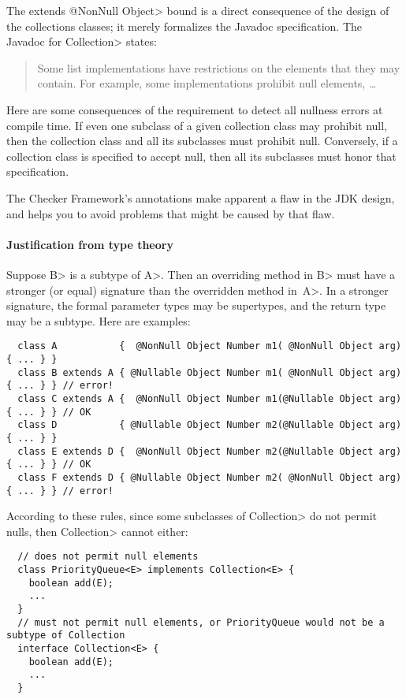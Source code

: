 The \<extends @NonNull Object> bound is a direct consequence of the design
of the collections classes; it merely formalizes the Javadoc specification.
The Javadoc for \<Collection> states:

\begin{quote}
  Some list implementations have restrictions on the elements that they may
  contain. For example, some implementations prohibit null elements, \ldots
\end{quote}

Here are some consequences of the requirement to detect all nullness errors
at compile time.  If even one subclass of a given collection class may
prohibit null, then the collection class and all its subclasses must
prohibit null.  Conversely, if a collection class is specified to accept
null, then all its subclasses must honor that specification.

The Checker Framework's annotations make apparent a flaw in the JDK
design, and helps you to avoid problems that might be caused by that flaw.


\paragraph{Justification from type theory\label{faq-list-map-nonnull-typeargs-junification-from-type-theory}}
Suppose \<B> is a subtype of \<A>.
Then an overriding method in \<B> must have a stronger (or equal) signature
than the overridden method in~\<A>.  In a stronger signature, the formal
parameter types may be supertypes, and the return type may be a subtype.
Here are examples:

\begin{Verbatim}
  class A           {  @NonNull Object Number m1( @NonNull Object arg) { ... } }
  class B extends A { @Nullable Object Number m1( @NonNull Object arg) { ... } } // error!
  class C extends A {  @NonNull Object Number m1(@Nullable Object arg) { ... } } // OK
  class D           { @Nullable Object Number m2(@Nullable Object arg) { ... } }
  class E extends D {  @NonNull Object Number m2(@Nullable Object arg) { ... } } // OK
  class F extends D { @Nullable Object Number m2( @NonNull Object arg) { ... } } // error!
\end{Verbatim}

According to these rules, since some subclasses of \<Collection> do not
permit nulls, then \<Collection> cannot either:

\begin{Verbatim}
  // does not permit null elements
  class PriorityQueue<E> implements Collection<E> {
    boolean add(E);
    ...
  }
  // must not permit null elements, or PriorityQueue would not be a subtype of Collection
  interface Collection<E> {
    boolean add(E);
    ...
  }
\end{Verbatim}


